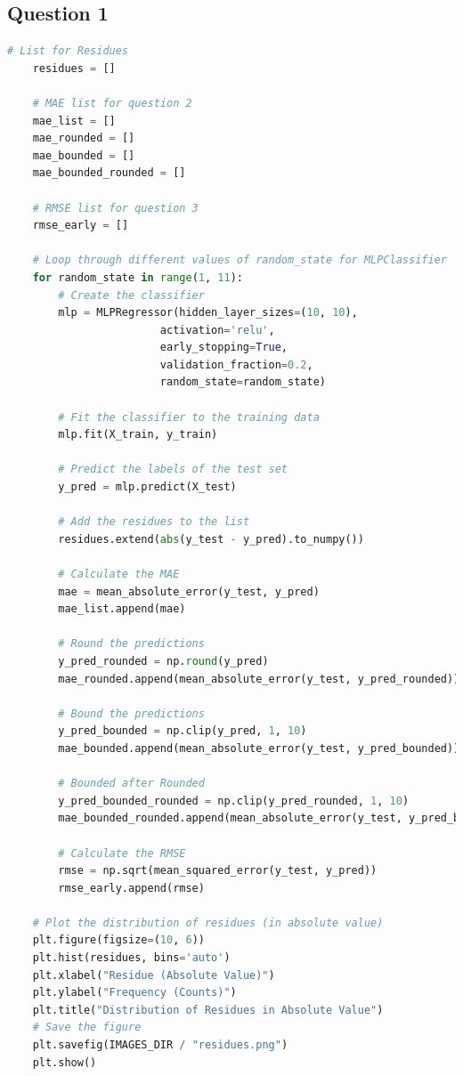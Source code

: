 \documentclass{article}
\begin{document}
\subsection*{Question 1}

\begin{lstlisting}[language=Python]
    # List for Residues 
    residues = []

    # MAE list for question 2
    mae_list = []
    mae_rounded = []
    mae_bounded = []
    mae_bounded_rounded = []

    # RMSE list for question 3
    rmse_early = []

    # Loop through different values of random_state for MLPClassifier
    for random_state in range(1, 11):
        # Create the classifier
        mlp = MLPRegressor(hidden_layer_sizes=(10, 10),
                        activation='relu',
                        early_stopping=True,
                        validation_fraction=0.2,
                        random_state=random_state)
        
        # Fit the classifier to the training data
        mlp.fit(X_train, y_train)

        # Predict the labels of the test set
        y_pred = mlp.predict(X_test)

        # Add the residues to the list
        residues.extend(abs(y_test - y_pred).to_numpy())

        # Calculate the MAE
        mae = mean_absolute_error(y_test, y_pred)
        mae_list.append(mae)

        # Round the predictions
        y_pred_rounded = np.round(y_pred)
        mae_rounded.append(mean_absolute_error(y_test, y_pred_rounded))

        # Bound the predictions
        y_pred_bounded = np.clip(y_pred, 1, 10)
        mae_bounded.append(mean_absolute_error(y_test, y_pred_bounded))

        # Bounded after Rounded
        y_pred_bounded_rounded = np.clip(y_pred_rounded, 1, 10)
        mae_bounded_rounded.append(mean_absolute_error(y_test, y_pred_bounded_rounded))

        # Calculate the RMSE
        rmse = np.sqrt(mean_squared_error(y_test, y_pred))
        rmse_early.append(rmse)

    # Plot the distribution of residues (in absolute value)
    plt.figure(figsize=(10, 6))
    plt.hist(residues, bins='auto')
    plt.xlabel("Residue (Absolute Value)")
    plt.ylabel("Frequency (Counts)")
    plt.title("Distribution of Residues in Absolute Value")
    # Save the figure
    plt.savefig(IMAGES_DIR / "residues.png")
    plt.show()
\end{lstlisting}
\end{document}
